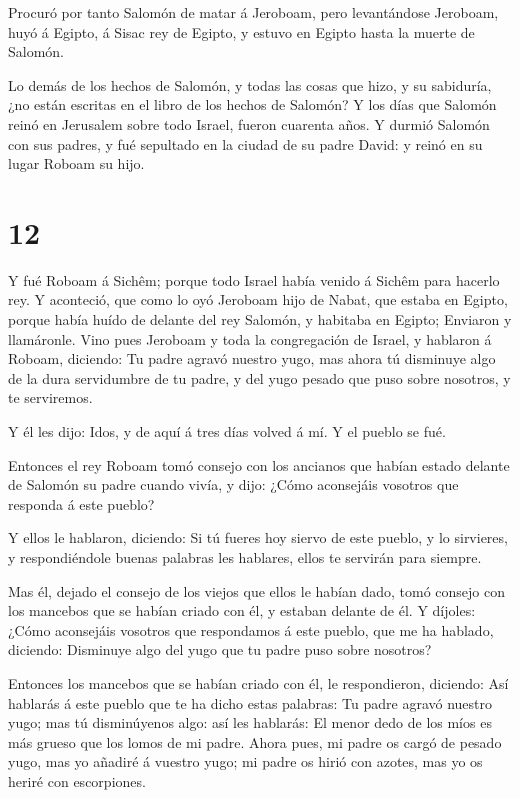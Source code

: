  Procuró por tanto Salomón de matar á Jeroboam, pero
levantándose Jeroboam, huyó á Egipto, á Sisac rey de Egipto, y estuvo en
Egipto hasta la muerte de Salomón.

 Lo demás de los hechos de Salomón, y todas las cosas que
hizo, y su sabiduría, ¿no están escritas en el libro de los hechos de
Salomón?  Y los días que Salomón reinó en Jerusalem sobre
todo Israel, fueron cuarenta años.  Y durmió Salomón con
sus padres, y fué sepultado en la ciudad de su padre David: y reinó en
su lugar Roboam su hijo.

\hypertarget{section-11}{%
\section{12}\label{section-11}}

 Y fué Roboam á Sichêm; porque todo Israel había venido á
Sichêm para hacerlo rey.  Y aconteció, que como lo oyó
Jeroboam hijo de Nabat, que estaba en Egipto, porque había huído de
delante del rey Salomón, y habitaba en Egipto;  Enviaron y
llamáronle. Vino pues Jeroboam y toda la congregación de Israel, y
hablaron á Roboam, diciendo:  Tu padre agravó nuestro yugo,
mas ahora tú disminuye algo de la dura servidumbre de tu padre, y del
yugo pesado que puso sobre nosotros, y te serviremos.

 Y él les dijo: Idos, y de aquí á tres días volved á mí. Y
el pueblo se fué.

 Entonces el rey Roboam tomó consejo con los ancianos que
habían estado delante de Salomón su padre cuando vivía, y dijo: ¿Cómo
aconsejáis vosotros que responda á este pueblo?

 Y ellos le hablaron, diciendo: Si tú fueres hoy siervo de
este pueblo, y lo sirvieres, y respondiéndole buenas palabras les
hablares, ellos te servirán para siempre.

 Mas él, dejado el consejo de los viejos que ellos le habían
dado, tomó consejo con los mancebos que se habían criado con él, y
estaban delante de él.  Y díjoles: ¿Cómo aconsejáis vosotros
que respondamos á este pueblo, que me ha hablado, diciendo: Disminuye
algo del yugo que tu padre puso sobre nosotros?

 Entonces los mancebos que se habían criado con él, le
respondieron, diciendo: Así hablarás á este pueblo que te ha dicho estas
palabras: Tu padre agravó nuestro yugo; mas tú disminúyenos algo: así
les hablarás: El menor dedo de los míos es más grueso que los lomos de
mi padre.  Ahora pues, mi padre os cargó de pesado yugo,
mas yo añadiré á vuestro yugo; mi padre os hirió con azotes, mas yo os
heriré con escorpiones.


